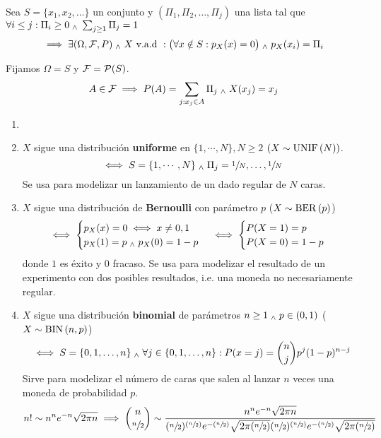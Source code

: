 \begin{teo}
	Sea $S=\{x_1, x_2, \dots \}$ un conjunto y $(\Pi_1, \Pi_2, \dots, \Pi_j)$ una lista tal que \\
	$\forall i \leq j : \Pi_i \geq 0 \; _{\wedge} \; \sum_{j\geq 1}\Pi_j=1$
	\[\implies \exists (\Omega, \mathcal{F}, P) \; _{\wedge} \; X\text{ v.a.d }:\big(\forall  x\notin S :p_X(x)= 0 \big) \; _{\wedge} \; p_X(x_i)=\Pi_i\]
	\begin{dem}
		Fijamos $\Omega = S$ y $\mathcal{F}=\mathcal{P}(S)$.
		\[A\in \mathcal{F} \implies P(A)=\sum_{j:x_j\in A}\Pi_j \; _{\wedge} \; X(x_j)=x_j\]
	\end{dem}
\end{teo}

\begin{ejem}
	\begin{enumerate}
		\item []
		\item $X$ sigue una distribución \textbf{uniforme} en $\{1, \cdots, N\}, N\geq2$ $(X\sim\operatorname{UNIF}\left(N\right))$.
		      \[\iff S=\{1, \cdots, N\} \; _{\wedge} \; {\Pi_j}={\sfrac{1}{N}, \dots, \sfrac{1}{N}}\]
		      Se usa para modelizar un lanzamiento de un dado regular de $N$ caras.
		\item $X$ sigue una distribución de \textbf{Bernoulli} con parámetro $p$ ($X\sim\operatorname{BER}\left(p\right)$)
		      \[\iff \begin{cases}
				      p_X(x)=0 \iff x\ne 0, 1 \\
				      p_X(1)=p \; _{\wedge} \; p_X(0)=1-p
			      \end{cases}\iff\begin{cases}
				      P(X=1)=p \\
				      P(X=0)=1-p
			      \end{cases}\]
		      donde $1$ es éxito y $0$ fracaso. Se usa para modelizar el resultado de un experimento con dos posibles resultados, i.e. una moneda no necesariamente regular.
		\item $X$ sigue una distribución \textbf{binomial} de parámetros $n\geq 1 \; _{\wedge} \; p\in (0, 1)$ ($X\sim\operatorname{BIN}\left(n, p\right)$)
		      \[\iff S=\{0, 1, \dots, n\} \; _{\wedge} \; \forall j\in \{0, 1, \dots, n\}:P(x=j)=\binom{n}{j}p^j(1-p)^{n-j}\]
		      Sirve para modelizar el número de caras que salen al lanzar $n$ veces una moneda de probabilidad $p$.
		      \[n! \sim n^ne^{-n}\sqrt{2\pi n}\implies \binom{n}{\sfrac{n}{2}}\sim\frac{n^ne^{-n}\sqrt{2\pi n}}{(\sfrac{n}        {2})^{(\sfrac{n}{2})}e^{-(\sfrac{n}{2})}\sqrt{2\pi (\sfrac{n}{2})}(\sfrac{n}{2})^{(\sfrac{n}{2})}e^{-(\sfrac{n}     {2})}\sqrt{2\pi (\sfrac{n}{2})}}\]


\end{enumerate}
\end{ejem}

